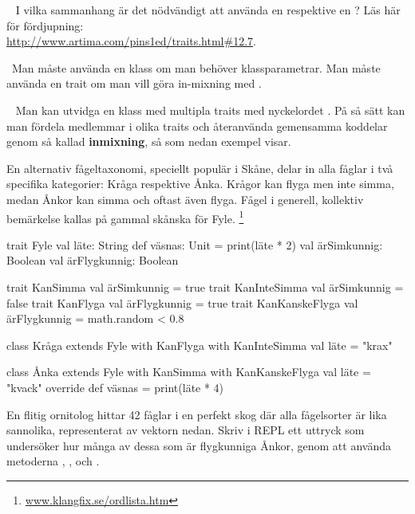 
\QUESTBEGIN

\Task \what~ I vilka sammanhang är det nödvändigt att använda en  respektive en ? Läs här för fördjupning:\\  \href{http://www.artima.com/pins1ed/traits.html\#12.7}{http://www.artima.com/pins1ed/traits.html\#12.7}.


\SOLUTION


\TaskSolved \what~Man måste använda en klass om man behöver klassparametrar. Man måste använda en trait om man vill göra in-mixning med . \\

 \QUESTEND




\QUESTBEGIN

\Task \label{task:fyle} \what~   Man kan utvidga en klass med multipla traits med nyckelordet . På så sätt kan man fördela medlemmar i olika traits och återanvända gemensamma koddelar genom så kallad \textbf{inmixning}, så som nedan exempel visar.

En alternativ fågeltaxonomi, speciellt populär i Skåne, delar in alla fåglar i två specifika kategorier: Kråga respektive Ånka. Krågor kan flyga men inte simma, medan Ånkor kan simma och oftast även flyga. Fågel i generell, kollektiv bemärkelse kallas på gammal skånska för Fyle.%
\footnote{\href{http://www.klangfix.se/ordlista.htm}{www.klangfix.se/ordlista.htm}}

\begin{CodeSmall}
trait Fyle {
  val läte: String
  def väsnas: Unit = print(läte * 2)
  val ärSimkunnig: Boolean
  val ärFlygkunnig: Boolean
}

trait KanSimma       { val ärSimkunnig = true }
trait KanInteSimma   { val ärSimkunnig = false }
trait KanFlyga       { val ärFlygkunnig = true }
trait KanKanskeFlyga { val ärFlygkunnig = math.random < 0.8 }

class Kråga extends Fyle with KanFlyga with KanInteSimma {
  val läte = "krax"
}

class Ånka extends Fyle with KanSimma with KanKanskeFlyga {
  val läte = "kvack"
  override def väsnas = print(läte * 4)
}
\end{CodeSmall}

\Subtask En flitig ornitolog hittar 42 fåglar i en perfekt skog där alla fågelsorter är lika sannolika, representerat av vektorn  nedan. Skriv i REPL ett uttryck som undersöker hur många av dessa som är flygkunniga Ånkor, genom att använda metoderna , ,  och .

